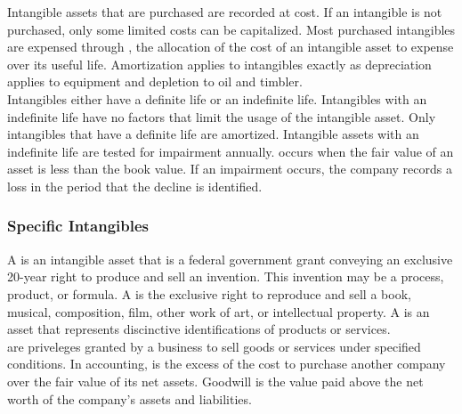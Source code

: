 \documentclass{article}
\begin{document}
Intangible assets that are purchased are recorded at cost. If an intangible is not purchased, only some limited costs can be capitalized. Most purchased intangibles are expensed through , the allocation of the cost of an intangible asset to expense over its useful life. Amortization applies to intangibles exactly as depreciation applies to equipment and depletion to oil and timbler. \\ 

Intangibles either have a definite life or an indefinite life. Intangibles with an indefinite life have no factors that limit the usage of the intangible asset. Only intangibles that have a definite life are amortized. Intangible assets with an indefinite life are tested for impairment annually.  occurs when the fair value of an asset is less than the book value. If an impairment occurs, the company records a loss in the period that the decline is identified. 

\subsubsection{Specific Intangibles}

A  is an intangible asset that is a federal government grant conveying an exclusive 20-year right to produce and sell an invention. This invention may be a process, product, or formula. A  is the exclusive right to reproduce and sell a book, musical, composition, film, other work of art, or intellectual property. A  is an asset that represents discinctive identifications of products or services. \\ 

 are priveleges granted by a business to sell goods or services under specified conditions. In accounting,  is the excess of the cost to purchase another company over the fair value of its net assets. Goodwill is the value paid above the net worth of the company's assets and liabilities. 
\end{document}
